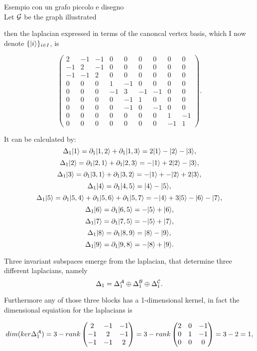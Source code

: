 \documentclass[../2.tex]{subfiles}
\begin{document}
    {\color{red} Esempio con un grafo piccolo e disegno \\

    Let $\mathcal{G}$ be the graph illustrated 
    
    then the laplacian expressed in terms of the canoncal vertex basis, which I now denote $\{| i \rangle\}_{i \in I}$, is

    \[\begin{pmatrix}
            2 & -1 & -1 & 0 & 0 & 0 & 0 & 0 & 0 \\
            -1 & 2 & -1 & 0 & 0 & 0 & 0 & 0 & 0 \\
            -1 & -1 & 2 & 0 & 0 & 0 & 0 & 0 & 0 \\
            0 & 0 & 0 & 1 & -1 & 0 & 0 & 0 & 0 \\
            0 & 0 & 0 & -1 & 3 & -1 & -1 & 0 & 0 \\
            0 & 0 & 0 & 0 & -1 & 1 & 0 & 0 & 0 \\
            0 & 0 & 0 & 0 & -1 & 0 & -1 & 0 & 0 \\
            0 & 0 & 0 & 0 & 0 & 0 & 0 & 1 & -1 \\
            0 & 0 & 0 & 0 & 0 & 0 & 0 & -1 & 1 
        \end{pmatrix}. \] 

    It can be calculated by:
    \[ \Delta_1 | 1 \rangle = \partial_1| 1,2 \rangle + \partial_1| 1,3 \rangle = 2| 1 \rangle-| 2 \rangle-| 3 \rangle,\]
    \[ \Delta_1 | 2 \rangle = \partial_1| 2,1 \rangle + \partial_1| 2,3 \rangle = -| 1 \rangle+2| 2 \rangle-| 3 \rangle,\]
    \[ \Delta_1 | 3 \rangle = \partial_1| 3,1 \rangle + \partial_1| 3,2 \rangle = -| 1 \rangle+-| 2 \rangle+2| 3 \rangle,\]
    \[ \Delta_1 | 4 \rangle = \partial_1| 4,5 \rangle = | 4 \rangle-| 5 \rangle,\]
    \[ \Delta_1 | 5 \rangle = \partial_1| 5,4 \rangle+\partial_1| 5,6 \rangle+\partial_1| 5,7 \rangle = -| 4 \rangle+3| 5 \rangle-| 6 \rangle-| 7 \rangle,\]
    \[ \Delta_1 | 6 \rangle = \partial_1| 6,5 \rangle = -| 5 \rangle+| 6 \rangle,\]
    \[ \Delta_1 | 7 \rangle = \partial_1| 7,5 \rangle = -| 5 \rangle+| 7 \rangle,\]
    \[ \Delta_1 | 8 \rangle = \partial_1| 8,9 \rangle = | 8 \rangle-| 9 \rangle,\]
    \[ \Delta_1 | 9 \rangle = \partial_1| 9,8 \rangle = -| 8 \rangle+| 9 \rangle.\] 

    Three invariant subspaces emerge from the laplacian, that determine three different laplacians, namely
    \[ \Delta_1 = \Delta_1^{\mathcal{A}} \oplus \Delta_1^{\mathcal{B}} \oplus \Delta_1^{\mathcal{C}}. \]

    Furthermore any of those three blocks has a 1-dimensional kernel, in fact the dimensional equiation for the laplacians is

    \[dim(ker\Delta_1^{\mathcal{A}}) = 3 - rank
    \begin{pmatrix}
        2 & -1 & -1  \\
        -1 & 2 & -1  \\
        -1 & -1 & 2 
    \end{pmatrix} = 3 - rank
    \begin{pmatrix}
        2 & 0 & -1  \\
        0 & 1 & -1  \\
        0 & 0 & 0 
    \end{pmatrix} = 3 - 2 =  1, \]

}
\end{document}
